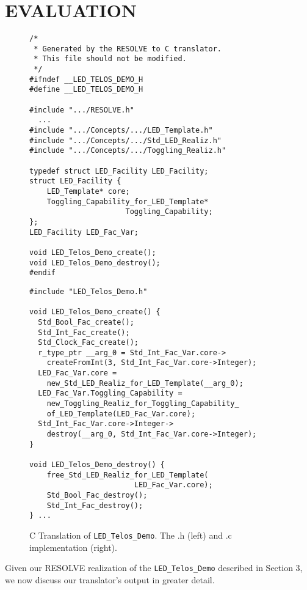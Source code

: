 \section{EVALUATION}

\begin{figure*}
\begin{minipage}{0.4\textwidth}
\begin{verbatim}
/*
 * Generated by the RESOLVE to C translator. 
 * This file should not be modified.
 */
#ifndef __LED_TELOS_DEMO_H
#define __LED_TELOS_DEMO_H

#include ".../RESOLVE.h"
  ...
#include ".../Concepts/.../LED_Template.h"
#include ".../Concepts/.../Std_LED_Realiz.h"
#include ".../Concepts/.../Toggling_Realiz.h"

typedef struct LED_Facility LED_Facility;
struct LED_Facility {
    LED_Template* core;
    Toggling_Capability_for_LED_Template* 
                      Toggling_Capability;
};
LED_Facility LED_Fac_Var;

void LED_Telos_Demo_create();
void LED_Telos_Demo_destroy();
#endif
\end{verbatim}
\end{minipage}
\hspace{1.5cm} 
\begin{minipage}{0.4\textwidth}
\begin{verbatim}
#include "LED_Telos_Demo.h"

void LED_Telos_Demo_create() {
  Std_Bool_Fac_create();
  Std_Int_Fac_create();
  Std_Clock_Fac_create();
  r_type_ptr __arg_0 = Std_Int_Fac_Var.core->
    createFromInt(3, Std_Int_Fac_Var.core->Integer);
  LED_Fac_Var.core = 
    new_Std_LED_Realiz_for_LED_Template(__arg_0);
  LED_Fac_Var.Toggling_Capability = 
    new_Toggling_Realiz_for_Toggling_Capability_
    of_LED_Template(LED_Fac_Var.core);
  Std_Int_Fac_Var.core->Integer->
    destroy(__arg_0, Std_Int_Fac_Var.core->Integer);
}

void LED_Telos_Demo_destroy() {
    free_Std_LED_Realiz_for_LED_Template(
    				    LED_Fac_Var.core);
    Std_Bool_Fac_destroy();
    Std_Int_Fac_destroy();
} ...
\end{verbatim}
\end{minipage}
\caption{C Translation of \texttt{LED\_Telos\_Demo}. The .h (left) and .c implementation (right).}
\label{fig:demo}
\end{figure*}

Given our RESOLVE realization of the \texttt{LED\_Telos\_Demo} described in Section 3, we now discuss our translator's output in greater detail.

